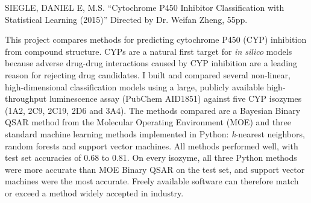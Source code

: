 SIEGLE, DANIEL E, M.S.
``Cytochrome P450 Inhibitor Classification with Statistical Learning (2015)'' Directed by Dr. Weifan Zheng, 55pp.
\vspace{1cm}


This project compares methods for predicting cytochrome P450 (CYP) inhibition from compound structure. CYPs are a natural first target for \textit{in silico} models because adverse drug-drug interactions caused by CYP inhibition are a leading reason for rejecting drug candidates. I built and compared several non-linear, high-dimensional classification models using a large, publicly available high-throughput luminescence assay (PubChem AID1851) against five CYP isozymes (1A2, 2C9, 2C19, 2D6 and 3A4). The methods compared are a Bayesian Binary QSAR method from the Molecular Operating Environment (MOE) and three standard machine learning methods implemented in Python: \textit{k}-nearest neighbors, random forests and support vector machines. All methods performed well, with test set accuracies of 0.68 to 0.81. On every isozyme, all three Python methods were more accurate than MOE Binary QSAR on the test set, and support vector machines were the most accurate. Freely available software can therefore match or exceed a method widely accepted in industry.
